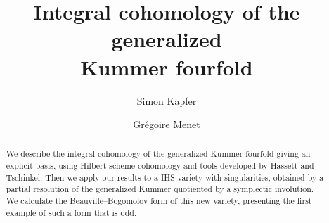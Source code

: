 \documentclass{alggeom}
\begin{document}
\title{\bf Integral cohomology of the generalized\\Kummer fourfold}


\author{Simon Kapfer}
\address{Institute of Mathematics of Augsburg university, D--86159 Augsburg, Germany}
\author{Gr\'egoire Menet}
\address{University of Campinas, Institudo de Matematica estatistica e Camputaçao Cientifica, Cx. Postal 6065 - CEP 13083-970-Campinas-SP, Brazil}

\begin{abstract}
We describe the integral cohomology of the generalized Kummer fourfold giving an explicit basis, using Hilbert scheme cohomology and tools developed by Hassett and Tschinkel.
Then we apply our results to a IHS variety with singularities, obtained by a partial resolution of the generalized Kummer quotiented by a symplectic involution. 
We calculate the Beauville--Bogomolov form of this new variety, presenting the first example of such a form that is odd.
\end{abstract}
\maketitle
\end{document}
